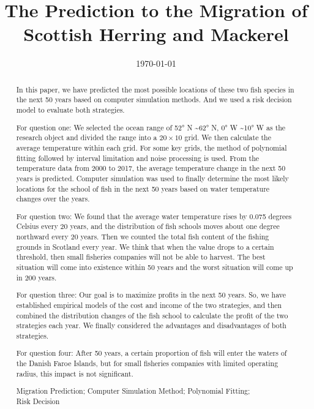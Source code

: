 \documentclass{mcmthesis}
\title{\large The Prediction to the Migration of Scottish Herring and Mackerel }
\author{}
\date{\today}
\numberwithin{figure}{section}
\numberwithin{table}{section}
\begin{document}
\begin{abstract}
  In this paper, we have predicted the most possible locations of these two fish species in the next 50 years based on computer simulation methods. And we used a risk decision model to evaluate both strategies. 
  
  For question one: We selected the ocean range of \ang{52} N \textasciitilde \ang{62} N, \ang{0} W \textasciitilde \ang{10} W as the research object and divided the range into a $20 \times 10$ grid. We then calculate the average temperature within each grid. For some key grids, the method of polynomial fitting followed by interval limitation and noise processing is used. From the temperature data from 2000 to 2017, the average temperature change in the next 50 years is predicted. 
  Computer simulation was used to finally determine the most likely locations for the school of fish in the next 50 years based on water
temperature changes over the years.

  For question two: We found that the average water temperature rises by 0.075 degrees Celsius every 20 years, and the distribution of fish schools moves about one degree northward every 20 years. Then we counted the total fish content of the fishing grounds in Scotland every year. We think that when the value drops to a certain threshold, then small fisheries companies will not be able to harvest. The best situation will come into existence within 50 years and the worst situation will come up in 200 years. 
  
  For question three: Our goal is to maximize profits in the next 50 years. So, we have established empirical models of the cost and income of the two strategies, and then combined the distribution changes of the fish school to calculate the profit of the two strategies each year. We finally considered the advantages and disadvantages of both strategies. 
  
  For question four: After 50 years, a certain proportion of fish will enter the waters of the Danish Faroe Islands, but for small fisheries companies with limited operating radius, this impact is not significant.
  
\begin{keywords}
Migration Prediction; Computer Simulation Method; Polynomial Fitting; 
\\ \hspace*{1.2cm}Risk Decision
\end{keywords}
\end{abstract}
\maketitle
\pagestyle{empty}
\newpage                                                          %
\begin{adjustwidth}{-1cm}{0cm}

\setcounter{tocdepth}{3}
\thispagestyle{empty}
\tableofcontents                                                  %

\end{adjustwidth}
\end{document}
